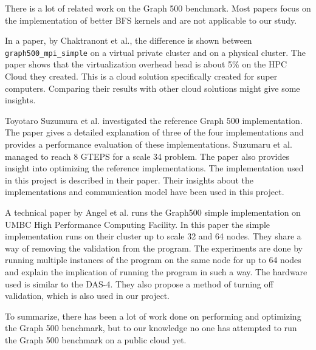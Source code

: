 There is a lot of related work on the Graph 500 benchmark. Most papers focus on the implementation of better BFS kernels and are not applicable to our study.

In a paper, by Chaktranont et al.\cite{chakthranont2014exploring}, the difference is shown between \texttt{graph500\_mpi\_simple} on a virtual private cluster and on a physical cluster. The paper shows that the  virtualization overhead head is about 5\% on the HPC Cloud they created. This is a cloud solution specifically created for super computers. Comparing their results with other cloud solutions might give some insights.

Toyotaro Suzumura et al. \cite{suzumura2011performance} investigated the reference Graph 500 implementation. The paper gives a detailed explanation of three of the four implementations and provides a performance evaluation of these implementations. Suzumaru et al. managed to reach 8 GTEPS for a scale 34 problem. The paper also provides insight into optimizing the reference implementations. The implementation used in this project is described in their paper.  Their insights about the implementations and communication model have been used in this project.

A technical paper by Angel et al.\cite{angel2012graph} runs the Graph500 simple implementation on UMBC High Performance Computing Facility. In this paper the simple implementation runs on their cluster up to scale 32 and 64 nodes. They share a way of removing the validation from the program. The experiments are done by running multiple instances of the program on the same node for up to 64 nodes and explain the implication of running the program in such a way. The hardware used is similar to the DAS-4. They also propose a method of turning off validation, which is also used in our project.

To summarize, there has been a lot of work done on performing and optimizing the Graph 500 benchmark, but to our knowledge no one has attempted to run the Graph 500 benchmark on a public cloud yet.